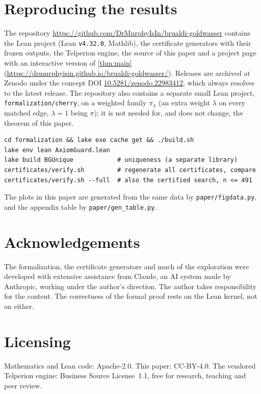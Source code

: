 \documentclass[11pt]{article}
\theoremstyle{definition}
\begin{document}
\section{Reproducing the results}

The repository \url{https://github.com/DrMurphyIsIn/brualdi-goldwasser} contains the Lean project
(Lean \texttt{v4.32.0}, Mathlib), the certificate generators with their frozen outputs, the Telperion
engine, the source of this paper and a project page with an interactive version of \cref{thm:main}
(\url{https://drmurphyisin.github.io/brualdi-goldwasser/}). Releases are archived at Zenodo under the
concept DOI \href{https://doi.org/10.5281/zenodo.22983412}{10.5281/zenodo.22983412}, which always resolves
to the latest release. The repository also contains a separate small Lean project,
\texttt{formalization/cherry}, on a weighted family $\pi_\lambda$ (an extra weight $\lambda$ on every
matched edge, $\lambda=1$ being $\pi$); it is not needed for, and does not change, the theorem of this paper.
\begin{verbatim}
cd formalization && lake exe cache get && ./build.sh
lake env lean AxiomGuard.lean
lake build BGUnique            # uniqueness (a separate library)
certificates/verify.sh         # regenerate all certificates, compare
certificates/verify.sh --full  # also the certified search, n <= 491
\end{verbatim}
The plots in this paper are generated from the same data by \texttt{paper/figdata.py}, and the appendix
table by \texttt{paper/gen\_table.py}.

\section*{Acknowledgements}
The formalization, the certificate generators and much of the exploration were developed with extensive
assistance from Claude, an AI system made by Anthropic, working under the author's direction. The author
takes responsibility for the content. The correctness of the formal proof rests on the Lean kernel, not
on either.

\section*{Licensing}
Mathematics and Lean code: Apache-2.0. This paper: CC-BY-4.0. The vendored Telperion engine: Business
Source License~1.1, free for research, teaching and peer review.
\end{document}

